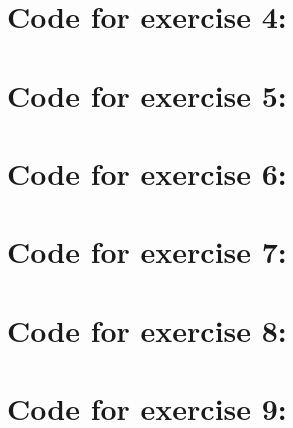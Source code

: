 \documentclass[a4paper,norsk, 10pt]{article}
\begin{document}
\appendix

\section{Code for exercise 4:}


\section{Code for exercise 5:}


\section{Code for exercise 6:}


\section{Code for exercise 7:}


\section{Code for exercise 8:}


\section{Code for exercise 9:}

\end{document}
